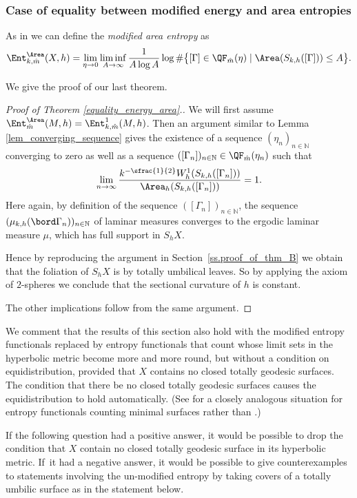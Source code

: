 \subsubsection{Case of equality between modified energy and area entropies} \label{sss.equality_modified_entropies}

As in \cite{ALS,MN_currents} we can define the \emph{modified area entropy} as
\begin{equation*}
\Ent^{\Area}_{k,\hat m}(X,h)=\lim_{\eta\to 0}\liminf_{A\to\infty}\frac{1}{A\log A}\log\#\bigl\{[\Gamma]\in\QF_{\hat m}(\eta)\mid \Area(S_{k,h}([\Gamma]))\leq A\bigr\}.
\end{equation*}

We give the proof of our last theorem.

\begin{proof}[Proof of Theorem \ref{equality_energy_area}.]
We will first assume $\Ent^{\Area}_{\hat m}(M,h)=\Ent^{1}_{k,\hat m}(M,h)$. Then an argument similar to Lemma \ref{lem_converging_sequence} gives the existence of a sequence $(\eta_n)_{n\in\mathbb{N}}$ converging to zero as well as a sequence $([\Gamma_n])_{n\in\mathbb{N}}\in\QF_{\hat m}(\eta_n)$ such that
\begin{equation*}
\lim_{n\to\infty}\frac{k^{-\sfrac{1}{2}}W^{1}_{h}(S_{k,h}([\Gamma_n]))}{\Area_h(S_{k,h}([\Gamma_n]))}=1.
\end{equation*}
Here again, by definition of the sequence $([\Gamma_n])_{n\in\mathbb{N}}$, the sequence $(\mu_{k,h}(\bord \Gamma_n))_{n\in\mathbb{N}}$ of laminar measures converges to the ergodic laminar measure $\mu$, which has full support in $S_hX$.

Hence by reproducing the argument in Section~\ref{ss.proof_of_thm_B} we obtain that the \ksurface foliation of $S_hX$ is by totally umbilical leaves. So by applying the axiom of $2$-spheres we conclude that the sectional curvature of $h$ is constant.

The other implications follow from the same argument.
\end{proof}

\begin{remark} \label{remarkattheend}
We comment that the results of this section also hold with the modified entropy functionals replaced by entropy functionals that count \ksurfaces whose limit sets in the hyperbolic metric become more and more round, but without a condition on equidistribution, provided that $X$ contains no closed totally geodesic surfaces. The condition that there be no closed totally geodesic surfaces causes the equidistribution to hold automatically. (See \cite{MN_currents} for a closely analogous situation for entropy functionals counting minimal surfaces rather than \ksurfaces.)

If the following question had a positive answer, it would be possible to drop the condition that $X$ contain no closed totally geodesic surface in its hyperbolic metric. If~it had a negative answer, it would be possible to give counterexamples to statements involving the un-modified \ksurface entropy by taking covers of a totally umbilic surface as in the statement below.
\end{remark}

